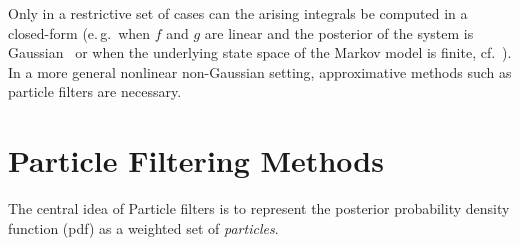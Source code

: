 Only in a restrictive set of cases can the arising integrals be
computed in a closed-form (e.\,g.\ when $f$ and $g$ are linear and the
posterior of the system is Gaussian~\cite[175]{arulampalam} or when
the underlying state space of the Markov model is finite,
cf.~\cite[Example 1]{doucet}). In a more general nonlinear
non-Gaussian setting, approximative methods such as particle filters
are necessary.

\section*{Particle Filtering Methods}
The central idea of Particle filters is to represent the posterior
probability density function (pdf) as a weighted set of
\emph{particles}.



